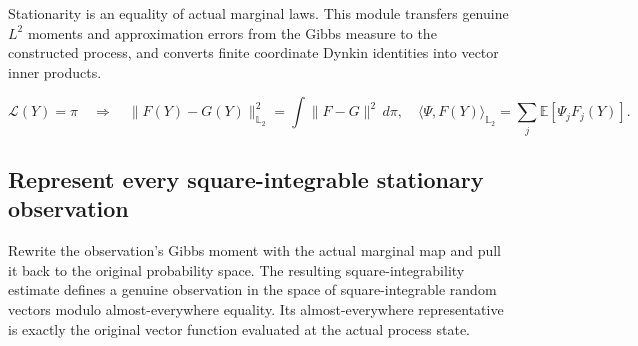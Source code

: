 \documentclass[11pt,a4paper]{report}
\begin{document}
Stationarity is an equality of actual marginal laws. This module transfers genuine \(L^{2}\) moments and approximation errors from the Gibbs measure to the constructed process, and converts finite coordinate Dynkin identities into vector inner products.

\[\mathcal L(Y)=\pi\quad\Longrightarrow\quad\|F(Y)-G(Y)\|_{\mathbb L_2}^2=\int\|F-G\|^2\,d\pi,\quad \langle\Psi,F(Y)\rangle_{\mathbb L_2}=\sum_j\mathbb E[\Psi_jF_j(Y)].\]\subsection{\texorpdfstring{Represent every square-integrable stationary observation}{Represent every square-integrable stationary observation}}
\label{report-step-AverageLMC-LaplacianStationaryTest-lean-1}


Rewrite the observation's Gibbs moment with the actual marginal map and pull it back to the original probability space. The resulting square-integrability estimate defines a genuine observation in the space of square-integrable random vectors modulo almost-everywhere equality. Its almost-everywhere representative is exactly the original vector function evaluated at the actual process state.
\end{document}
